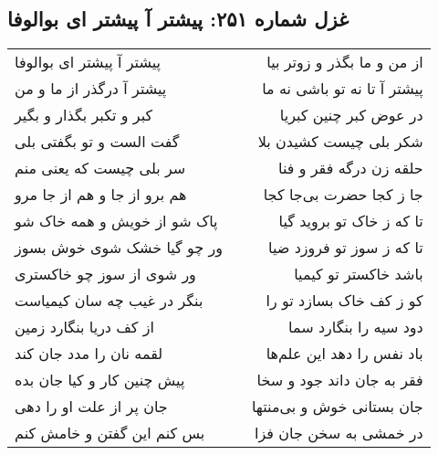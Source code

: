 \begin{center}
\section*{غزل شماره ۲۵۱: پیشتر آ پیشتر ای بوالوفا}
\label{sec:0251}
\begin{longtable}{l p{0.5cm} r}
پیشتر آ پیشتر ای بوالوفا
&&
از من و ما بگذر و زوتر بیا
\\
پیشتر آ درگذر از ما و من
&&
پیشتر آ تا نه تو باشی نه ما
\\
کبر و تکبر بگذار و بگیر
&&
در عوض کبر چنین کبریا
\\
گفت الست و تو بگفتی بلی
&&
شکر بلی چیست کشیدن بلا
\\
سر بلی چیست که یعنی منم
&&
حلقه زن درگه فقر و فنا
\\
هم برو از جا و هم از جا مرو
&&
جا ز کجا حضرت بی‌جا کجا
\\
پاک شو از خویش و همه خاک شو
&&
تا که ز خاک تو بروید گیا
\\
ور چو گیا خشک شوی خوش بسوز
&&
تا که ز سوز تو فروزد ضیا
\\
ور شوی از سوز چو خاکستری
&&
باشد خاکستر تو کیمیا
\\
بنگر در غیب چه سان کیمیاست
&&
کو ز کف خاک بسازد تو را
\\
از کف دریا بنگارد زمین
&&
دود سیه را بنگارد سما
\\
لقمه نان را مدد جان کند
&&
باد نفس را دهد این علم‌ها
\\
پیش چنین کار و کیا جان بده
&&
فقر به جان داند جود و سخا
\\
جان پر از علت او را دهی
&&
جان بستانی خوش و بی‌منتها
\\
بس کنم این گفتن و خامش کنم
&&
در خمشی به سخن جان فزا
\\
\end{longtable}
\end{center}
